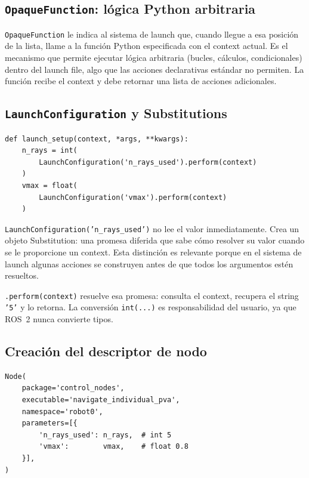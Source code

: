 \subsection{\texttt{OpaqueFunction}: lógica Python arbitraria}

\texttt{OpaqueFunction} le indica al sistema de launch que, cuando llegue a esa posición de la lista, llame a la función Python especificada con el context actual. Es el mecanismo que permite ejecutar lógica arbitraria (bucles, cálculos, condicionales) dentro del launch file, algo que las acciones declarativas estándar no permiten. La función recibe el context y debe retornar una lista de acciones adicionales.

\subsection{\texttt{LaunchConfiguration} y Substitutions}

\begin{lstlisting}[style=python, caption={Resolución de argumentos dentro de \texttt{launch\_setup}.}]
def launch_setup(context, *args, **kwargs):
    n_rays = int(
        LaunchConfiguration('n_rays_used').perform(context)
    )
    vmax = float(
        LaunchConfiguration('vmax').perform(context)
    )
\end{lstlisting}

\texttt{LaunchConfiguration('n\_rays\_used')} no lee el valor inmediatamente. Crea un objeto Substitution: una promesa diferida que sabe cómo resolver su valor cuando se le proporcione un context. Esta distinción es relevante porque en el sistema de launch algunas acciones se construyen antes de que todos los argumentos estén resueltos.

\texttt{.perform(context)} resuelve esa promesa: consulta el context, recupera el string \texttt{'5'} y lo retorna. La conversión \texttt{int(...)} es responsabilidad del usuario, ya que ROS~2 nunca convierte tipos.

\subsection{Creación del descriptor de nodo}

\begin{lstlisting}[style=python, caption={Creación del descriptor de nodo con parámetros.}]
Node(
    package='control_nodes',
    executable='navigate_individual_pva',
    namespace='robot0',
    parameters=[{
        'n_rays_used': n_rays,  # int 5
        'vmax':        vmax,    # float 0.8
    }],
)
\end{lstlisting}

